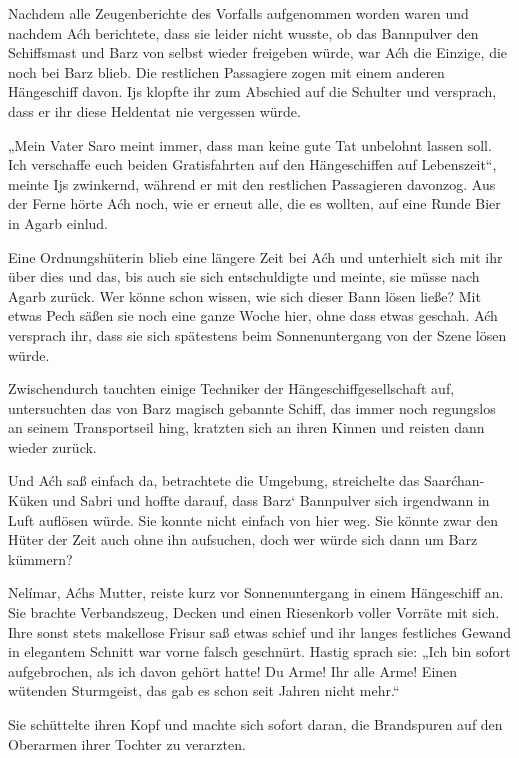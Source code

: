 Nachdem alle Zeugenberichte des Vorfalls aufgenommen worden waren und nachdem Aćh berichtete, dass sie leider nicht wusste, ob das Bannpulver den Schiffsmast und Barz von selbst wieder freigeben würde, war Aćh die Einzige, die noch bei Barz blieb. Die restlichen Passagiere zogen mit einem anderen Hängeschiff davon. Ijs klopfte ihr zum Abschied auf die Schulter und versprach, dass er ihr diese Heldentat nie vergessen würde.

„Mein Vater Saro meint immer, dass man keine gute Tat unbelohnt lassen soll. Ich verschaffe euch beiden Gratisfahrten auf den Hängeschiffen auf Lebenszeit“, meinte Ijs zwinkernd, während er mit den restlichen Passagieren davonzog. Aus der Ferne hörte Aćh noch, wie er erneut alle, die es wollten, auf eine Runde Bier in Agarb einlud.

Eine Ordnungshüterin blieb eine längere Zeit bei Aćh und unterhielt sich mit ihr über dies und das, bis auch sie sich entschuldigte und meinte, sie müsse nach Agarb zurück. Wer könne schon wissen, wie sich dieser Bann lösen ließe? Mit etwas Pech säßen sie noch eine ganze Woche hier, ohne dass etwas geschah. Aćh versprach ihr, dass sie sich spätestens beim Sonnenuntergang von der Szene lösen würde.

Zwischendurch tauchten einige Techniker der Hängeschiffgesellschaft auf, untersuchten das von Barz magisch gebannte Schiff, das immer noch regungslos an seinem Transportseil hing, kratzten sich an ihren Kinnen und reisten dann wieder zurück.

Und Aćh saß einfach da, betrachtete die Umgebung, streichelte das Saarćhan-Küken und Sabri und hoffte darauf, dass Barz‘ Bannpulver sich irgendwann in Luft auflösen würde. Sie konnte nicht einfach von hier weg. Sie könnte zwar den Hüter der Zeit auch ohne ihn aufsuchen, doch wer würde sich dann um Barz kümmern?



\trennzeichen



Nelímar, Aćhs Mutter, reiste kurz vor Sonnenuntergang in einem Hängeschiff an. Sie brachte Verbandszeug, Decken und einen Riesenkorb voller Vorräte mit sich. Ihre sonst stets makellose Frisur saß etwas schief und ihr langes festliches Gewand in elegantem Schnitt war vorne falsch geschnürt. Hastig sprach sie: „Ich bin sofort aufgebrochen, als ich davon gehört hatte! Du Arme! Ihr alle Arme! Einen wütenden Sturmgeist, das gab es schon seit Jahren nicht mehr.“

Sie schüttelte ihren Kopf und machte sich sofort daran, die Brandspuren auf den Oberarmen ihrer Tochter zu verarzten.

